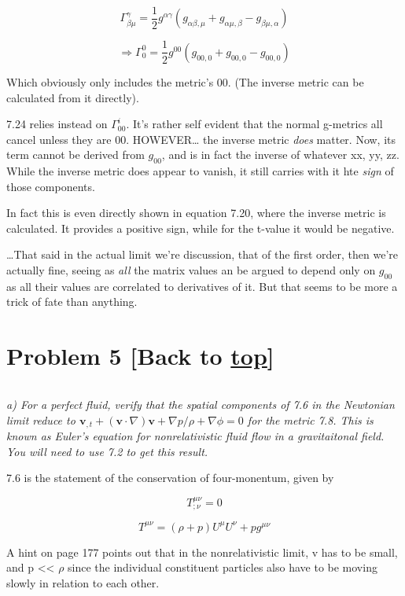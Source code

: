 \documentclass[landscape,letterpaper,10pt,english]{article}
\begin{document}
\[ \Gamma^\gamma_{\beta\mu} = \frac{1}{2} g^{\alpha\gamma} (g_{\alpha\beta,\mu} + g_{\alpha\mu,\beta} - g_{\beta\mu,\alpha})  \]

\[ \Rightarrow \Gamma^0_{0} = \frac{1}{2} g^{00} (g_{00,0} + g_{00,0} - g_{00,0})  \]

Which obviously only includes the metric's 00. (The inverse metric can
be calculated from it directly).

7.24 relies instead on \(\Gamma^i_{00}\). It's rather self evident that
the normal g-metrics all cancel unless they are 00. HOWEVER\ldots{} the
inverse metric \emph{does} matter. Now, its term cannot be derived from
\(g_00\), and is in fact the inverse of whatever xx, yy, zz. While the
inverse metric does appear to vanish, it still carries with it hte
\emph{sign} of those components.

In fact this is even directly shown in equation 7.20, where the inverse
metric is calculated. It provides a positive sign, while for the t-value
it would be negative.

\ldots That said in the actual limit we're discussion, that of the first
order, then we're actually fine, seeing as \emph{all} the matrix values
an be argued to depend only on \(g_00\) as all their values are
correlated to derivatives of it. But that seems to be more a trick of
fate than anything.

    \hypertarget{problem-5-back-to-top}{%
\section{\texorpdfstring{Problem 5 {[}Back to
\hyperref[toc]{top}{]}}{Problem 5 {[}Back to {]}}}\label{problem-5-back-to-top}}

\[\label{P5}\]

\emph{a) For a perfect fluid, verify that the spatial components of 7.6
in the Newtonian limit reduce to
\(\textbf{v}_{,t} + (\textbf{v}\cdot \nabla)\textbf{v} + \nabla p/\rho + \nabla \phi = 0\)
for the metric 7.8. This is known as Euler's equation for
nonrelativistic fluid flow in a gravitaitonal field. You will need to
use 7.2 to get this result.}

    7.6 is the statement of the conservation of four-monentum, given by

\[ T^{\mu\nu}_{;\nu}=0 \]

\[ T^{\mu\nu} = (\rho + p)U^\mu U^\nu + pg^{\mu\nu} \]

A hint on page 177 points out that in the nonrelativistic limit, v has
to be small, and p \textless\textless{} \(\rho\) since the individual
constituent particles also have to be moving slowly in relation to each
other.
\end{document}
